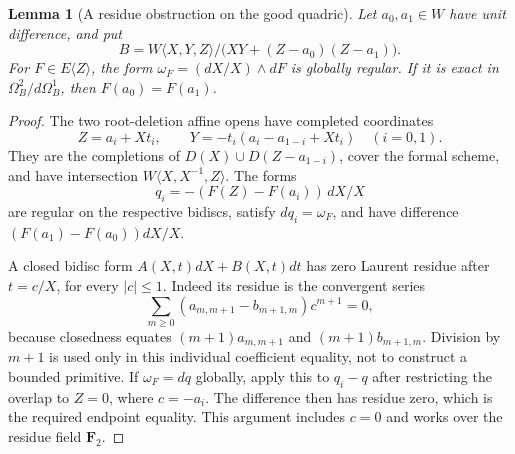 \documentclass[11pt,a4paper]{article}
\newtheorem{lemma}[theorem]{Lemma}
\theoremstyle{remark}
\begin{document}
\begin{lemma}[A residue obstruction on the good quadric]
\label{lem:tcreviewresidue}
Let $a_0,a_1\in W$ have unit difference, and put
\[
 B=W\langle X,Y,Z\rangle/
           \bigl(XY+(Z-a_0)(Z-a_1)\bigr).
\]
For $F\in E\langle Z\rangle$, the form
$\omega_F=(dX/X)\wedge dF$ is globally regular. If it is exact in
$\Omega_B^2/d\Omega_B^1$, then $F(a_0)=F(a_1)$.
\end{lemma}
\begin{proof}
The two root-deletion affine opens have completed coordinates
\[
 Z=a_i+Xt_i,\qquad
 Y=-t_i(a_i-a_{1-i}+Xt_i)\quad(i=0,1).
\]
They are the completions of $D(X)\cup D(Z-a_{1-i})$, cover the formal
scheme, and have intersection $W\langle X,X^{-1},Z\rangle$.
The forms
\[
 q_i=-(F(Z)-F(a_i))\,dX/X
\]
are regular on the respective bidiscs, satisfy $dq_i=\omega_F$, and
have difference $(F(a_1)-F(a_0))dX/X$.

A closed bidisc form $A(X,t)dX+B(X,t)dt$ has zero Laurent residue
after $t=c/X$, for every $|c|\le1$. Indeed its residue is the
convergent series
\[
 \sum_{m\ge0}(a_{m,m+1}-b_{m+1,m})c^{m+1}=0,
\]
because closedness equates $(m+1)a_{m,m+1}$ and
$(m+1)b_{m+1,m}$. Division by $m+1$ is used only in this individual
coefficient equality, not to construct a bounded primitive.
If $\omega_F=dq$ globally, apply this to $q_i-q$ after restricting
the overlap to $Z=0$, where $c=-a_i$. The difference then has residue
zero, which is the required endpoint equality. This argument includes
$c=0$ and works over the residue field $\mathbf F_2$.
\end{proof}
\end{document}
